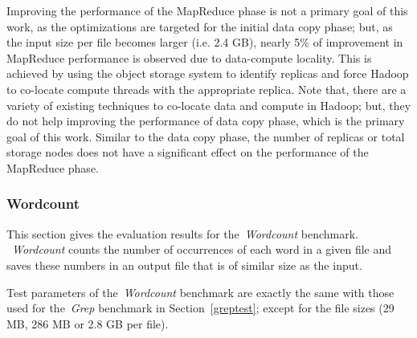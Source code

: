 \documentclass[preprint,12pt]{elsarticle}
\begin{document}
Improving the performance of the MapReduce phase is not a primary goal of this work, as the
optimizations are targeted for the initial data copy phase; but, as the input size per file
becomes larger (i.e. 2.4 GB), nearly 5\% of improvement in MapReduce performance is observed
due to data-compute locality. This is achieved by using the object storage system to identify
replicas and force Hadoop to co-locate compute threads with the appropriate replica. Note that,
there are a variety of existing techniques to co-locate data and compute in Hadoop; but, they
do not help improving the performance of data copy phase, which is the primary goal of this work.
Similar to the data copy phase, the number of replicas or total storage nodes does not have a
significant effect on the performance of the MapReduce phase.

\subsubsection{Wordcount}
This section gives the evaluation results for the~\textit{Wordcount} benchmark.
~\textit{Wordcount} counts the number of occurrences of each word in a given file and
saves these numbers in an output file that is of similar size as the input.

Test parameters of the~\textit{Wordcount} benchmark are exactly the same
with those used for the~\textit{Grep} benchmark in Section~\ref{greptest};
except for the file sizes (29 MB, 286 MB or 2.8 GB per file).
\end{document}
